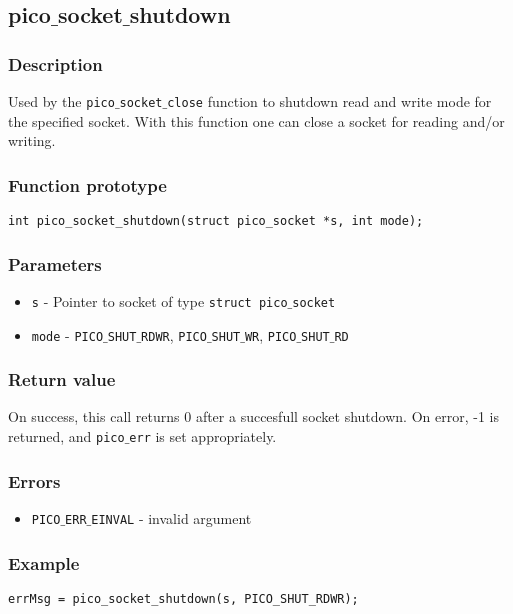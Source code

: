 \subsection{pico$\_$socket$\_$shutdown}

\subsubsection*{Description}
Used by the \texttt{pico$\_$socket$\_$close} function to shutdown read and write mode for
the specified socket. With this function one can close a socket for reading
and/or writing.

\subsubsection*{Function prototype}
\begin{verbatim}
int pico_socket_shutdown(struct pico_socket *s, int mode);
\end{verbatim}

\subsubsection*{Parameters}
\begin{itemize}[noitemsep]
\item \texttt{s} - Pointer to socket of type \texttt{struct pico$\_$socket}
\item \texttt{mode} - \texttt{PICO$\_$SHUT$\_$RDWR}, \texttt{PICO$\_$SHUT$\_$WR}, \texttt{PICO$\_$SHUT$\_$RD}
\end{itemize}

\subsubsection*{Return value}
On success, this call returns 0 after a succesfull socket shutdown.
On error, -1 is returned, and \texttt{pico$\_$err} is set appropriately.

\subsubsection*{Errors}
\begin{itemize}[noitemsep]
\item \texttt{PICO$\_$ERR$\_$EINVAL} - invalid argument
\end{itemize}

\subsubsection*{Example}
\begin{verbatim}
errMsg = pico_socket_shutdown(s, PICO_SHUT_RDWR);
\end{verbatim}


